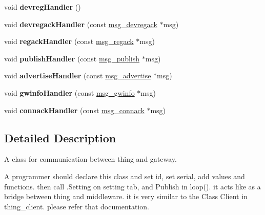 \begin{DoxyCompactItemize}
\item 
\hypertarget{classThingClient_a0b2105ce5421f8859664cac4b32e6478}{void {\bfseries devreg\-Handler} ()}\label{classThingClient_a0b2105ce5421f8859664cac4b32e6478}

\item 
\hypertarget{classThingClient_ad627f7e69476311017ef903144d6a505}{void {\bfseries devregack\-Handler} (const \hyperlink{structmsg__devregack}{msg\-\_\-devregack} $\ast$msg)}\label{classThingClient_ad627f7e69476311017ef903144d6a505}

\item 
\hypertarget{classThingClient_a08b89371ea7017864a53e4973109a178}{void {\bfseries regack\-Handler} (const \hyperlink{structmsg__regack}{msg\-\_\-regack} $\ast$msg)}\label{classThingClient_a08b89371ea7017864a53e4973109a178}

\item 
\hypertarget{classThingClient_acc74fdf4e099d0e9bb8ca4b5c431b11a}{void {\bfseries publish\-Handler} (const \hyperlink{structmsg__publish}{msg\-\_\-publish} $\ast$msg)}\label{classThingClient_acc74fdf4e099d0e9bb8ca4b5c431b11a}

\item 
\hypertarget{classThingClient_aa99dbe36483893c9c68533f1f6f037ab}{void {\bfseries advertise\-Handler} (const \hyperlink{structmsg__advertise}{msg\-\_\-advertise} $\ast$msg)}\label{classThingClient_aa99dbe36483893c9c68533f1f6f037ab}

\item 
\hypertarget{classThingClient_a2080616403d90b82f2ccf64198c8c156}{void {\bfseries gwinfo\-Handler} (const \hyperlink{structmsg__gwinfo}{msg\-\_\-gwinfo} $\ast$msg)}\label{classThingClient_a2080616403d90b82f2ccf64198c8c156}

\item 
\hypertarget{classThingClient_a6a460a7dc9e59e39fe6e3c25b742281a}{void {\bfseries connack\-Handler} (const \hyperlink{structmsg__connack}{msg\-\_\-connack} $\ast$msg)}\label{classThingClient_a6a460a7dc9e59e39fe6e3c25b742281a}

\end{DoxyCompactItemize}


\subsection{Detailed Description}
A class for communication between thing and gateway. 

A programmer should declare this class and set id, set serial, add values and functions. then call .Setting on setting tab, and Publish in loop(). it acts like as a bridge between thing and middleware. it is very similar to the Class Client in thing\-\_\-client. please refer that documentation. 

